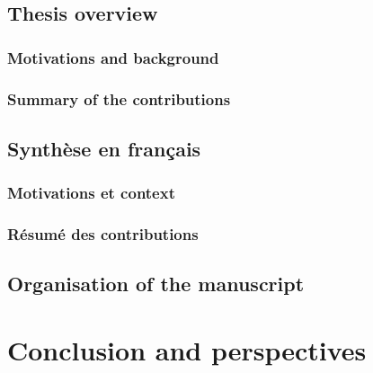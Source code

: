 \documentclass[french,12pt,a4paper]{book}
\begin{document}
\printglossary[type=\acronymtype,title=Acronyms, toctitle=Acronyms]

\chapter{Thesis overview}

\section{Motivations and background}

\section{Summary of the contributions}

\chapter{Synthèse en français}

\section{Motivations et context}

\section{Résumé des contributions}

\chapter{Organisation of the manuscript}



\mainmatter





\part{Conclusion and perspectives}

\printbibliography[heading=bibintoc]
\end{document}
